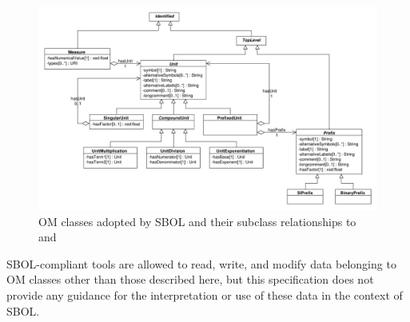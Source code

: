 {\begin{figure}[ht]
\begin{center}
\includegraphics[width=\linewidth]{uml/om}
\caption[]{OM classes adopted by SBOL and their subclass relationships to  and }
\label{uml:om}
\end{center}
\end{figure}

SBOL-compliant tools are allowed to read, write, and modify data belonging to OM classes other than those described here, but this specification does not provide any guidance for the interpretation or use of these data in the context of SBOL.
}



